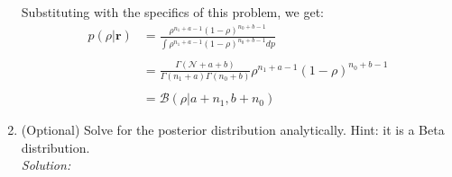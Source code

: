 \documentclass[12pt,a4paper]{article}
\begin{document}
\begin{enumerate}
		  Substituting with the specifics of this problem, we get: \\ 
		  
		  \begin{align*}
		  p(\rho\vert\textbf{r}) &= \frac{\rho^{n_1+a-1}(1-\rho)^{n_0+b-1}}{\int\rho^{n_1+a-1}(1-\rho)^{n_0+b-1}dp} \\ \\
		  &=\frac{\Gamma(\mathcal{N}+a+b)}{\Gamma(n_1+a)\Gamma(n_0+b)}\rho^{n_1+a-1}(1-\rho)^{n_0+b-1} \\ \\
		  &= \mathcal{B}(\rho \vert a +n_1,b + n_0)
		  \end{align*} 
  
  
  \item (Optional) Solve for the posterior distribution analytically.  Hint: it is a Beta distribution. \\
	  \emph{Solution:} \\
  
  
\end{enumerate}
\end{document}
